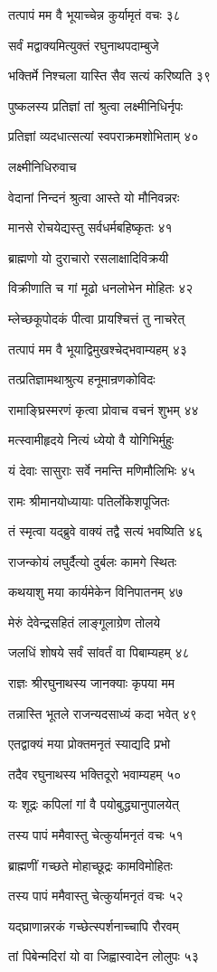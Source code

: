 तत्पापं मम वै भूयाच्चेन्न कुर्यामृतं वचः ३८

सर्वं मद्वाक्यमित्युक्तं रघुनाथपदाम्बुजे

भक्तिर्मे निश्चला यास्ति सैव सत्यं करिष्यति ३९

पुष्कलस्य प्रतिज्ञां तां श्रुत्वा लक्ष्मीनिधिर्नृपः

प्रतिज्ञां व्यदधात्सत्यां स्वपराक्रमशोभिताम् ४०

लक्ष्मीनिधिरुवाच

वेदानां निन्दनं श्रुत्वा आस्ते यो मौनिवन्नरः

मानसे रोचयेद्यस्तु सर्वधर्मबहिष्कृतः ४१

ब्राह्मणो यो दुराचारो रसलाक्षादिविक्रयी

विक्रीणाति च गां मूढो धनलोभेन मोहितः ४२

म्लेच्छकूपोदकं पीत्वा प्रायश्चित्तं तु नाचरेत्

तत्पापं मम वै भूयाद्विमुखश्चेद्भवाम्यहम् ४३

तत्प्रतिज्ञामथाश्रुत्य हनूमान्रणकोविदः

रामाङ्घ्रिस्मरणं कृत्वा प्रोवाच वचनं शुभम् ४४

मत्स्वामीहृदये नित्यं ध्येयो वै योगिभिर्मुहुः

यं देवाः सासुराः सर्वे नमन्ति मणिमौलिभिः ४५

रामः श्रीमानयोध्यायाः पतिर्लोकेशपूजितः

तं स्मृत्वा यद्ब्रुवे वाक्यं तद्वै सत्यं भवष्यिति ४६

राजन्कोयं लघुर्दैत्यो दुर्बलः कामगे स्थितः

कथयाशु मया कार्यमेकेन विनिपातनम् ४७

मेरुं देवेन्द्रसहितं लाङ्गूलाग्रेण तोलये

जलधिं शोषये सर्वं सांवर्तं वा पिबाम्यहम् ४८

राज्ञः श्रीरघुनाथस्य जानक्याः कृपया मम

तन्नास्ति भूतले राजन्यदसाध्यं कदा भवेत् ४९

एतद्वाक्यं मया प्रोक्तमनृतं स्याद्यदि प्रभो

तदैव रघुनाथस्य भक्तिदूरो भवाम्यहम् ५०

यः शूद्रः कपिलां गां वै पयोबुद्ध्यानुपालयेत्

तस्य पापं ममैवास्तु चेत्कुर्यामनृतं वचः ५१

ब्राह्मणीं गच्छते मोहाच्छूद्रः कामविमोहितः

तस्य पापं ममैवास्तु चेत्कुर्यामनृतं वचः ५२

यद्घ्राणान्नरकं गच्छेत्स्पर्शनाच्चापि रौरवम्

तां पिबेन्मदिरां यो वा जिह्वास्वादेन लोलुपः ५३

